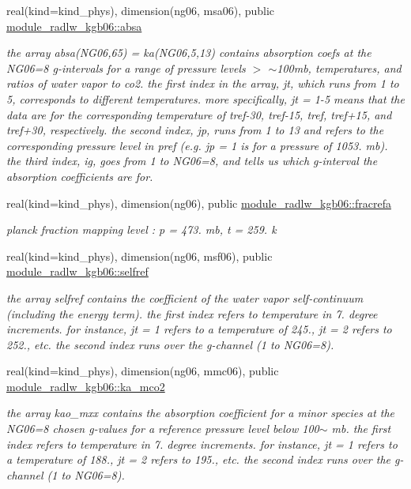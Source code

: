 \begin{DoxyCompactItemize}
real(kind=kind\+\_\+phys), dimension(ng06, msa06), public \hyperlink{group__module__radlw__kgbnn_ga21bd40309855c89a64b88be171bfde59}{module\+\_\+radlw\+\_\+kgb06\+::absa}
\begin{DoxyCompactList}\small\item\em the array absa(\+N\+G06,65) = ka(\+N\+G06,5,13) contains absorption coefs at the N\+G06=8 g-\/intervals for a range of pressure levels $>$ $\sim$100mb, temperatures, and ratios of water vapor to co2. the first index in the array, jt, which runs from 1 to 5, corresponds to different temperatures. more specifically, jt = 1-\/5 means that the data are for the corresponding temperature of tref-\/30, tref-\/15, tref, tref+15, and tref+30, respectively. the second index, jp, runs from 1 to 13 and refers to the corresponding pressure level in pref (e.\+g. jp = 1 is for a pressure of 1053. mb). the third index, ig, goes from 1 to N\+G06=8, and tells us which g-\/interval the absorption coefficients are for. \end{DoxyCompactList}\item 
real(kind=kind\+\_\+phys), dimension(ng06), public \hyperlink{group__module__radlw__kgbnn_ga1354ecbc5f07cd763847333e680c686a}{module\+\_\+radlw\+\_\+kgb06\+::fracrefa}
\begin{DoxyCompactList}\small\item\em planck fraction mapping level \+: p = 473. mb, t = 259. k \end{DoxyCompactList}\item 
real(kind=kind\+\_\+phys), dimension(ng06, msf06), public \hyperlink{group__module__radlw__kgbnn_ga98901725947a4477924a47af5e67277e}{module\+\_\+radlw\+\_\+kgb06\+::selfref}
\begin{DoxyCompactList}\small\item\em the array selfref contains the coefficient of the water vapor self-\/continuum (including the energy term). the first index refers to temperature in 7. degree increments. for instance, jt = 1 refers to a temperature of 245., jt = 2 refers to 252., etc. the second index runs over the g-\/channel (1 to N\+G06=8). \end{DoxyCompactList}\item 
real(kind=kind\+\_\+phys), dimension(ng06, mmc06), public \hyperlink{group__module__radlw__kgbnn_gadb5dab732383b82e89f1048ab5150c23}{module\+\_\+radlw\+\_\+kgb06\+::ka\+\_\+mco2}
\begin{DoxyCompactList}\small\item\em the array kao\+\_\+mxx contains the absorption coefficient for a minor species at the N\+G06=8 chosen g-\/values for a reference pressure level below 100$\sim$ mb. the first index refers to temperature in 7. degree increments. for instance, jt = 1 refers to a temperature of 188., jt = 2 refers to 195., etc. the second index runs over the g-\/channel (1 to N\+G06=8). \end{DoxyCompactList}\item 

\end{DoxyCompactItemize}
